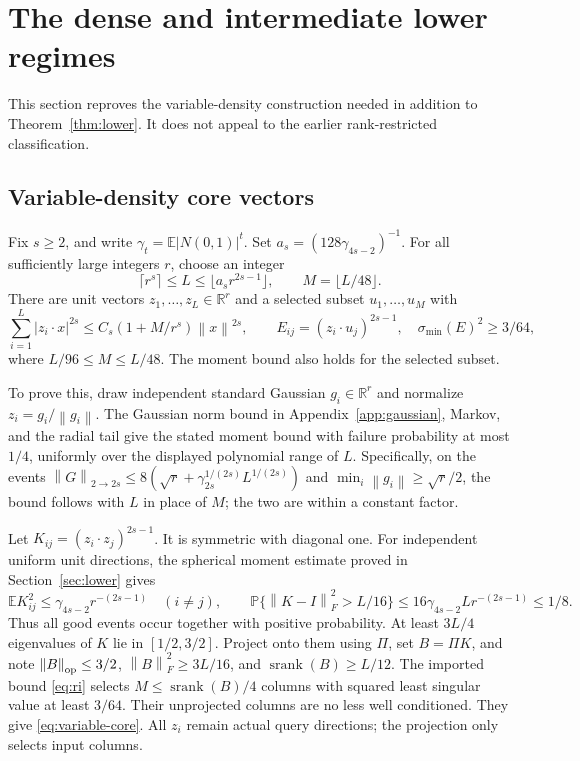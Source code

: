 \documentclass[11pt]{article}
\theoremstyle{remark}\newtheorem{remark}[theorem]{Remark}
\newcommand{\R}{\mathbb R}\newcommand{\E}{\mathbb E}\newcommand{\Prob}{\mathbb P}
\newcommand{\norm}[1]{\left\|#1\right\|}\newcommand{\ip}[2]{\left\langle #1,#2\right\rangle}
\DeclareMathOperator{\srank}{srank}
\begin{document}
\section{The dense and intermediate lower regimes}\label{sec:variable-lower}
This section reproves the variable-density construction needed in addition to Theorem~\ref{thm:lower}. It does not appeal to the earlier rank-restricted classification.

\subsection{Variable-density core vectors}
Fix $s\ge2$, and write $\gamma_t=\E|N(0,1)|^t$. Set $a_s=(128\gamma_{4s-2})^{-1}$. For all sufficiently large integers $r$, choose an integer
\[
 \lceil r^s\rceil\le L\le\lfloor a_s r^{2s-1}\rfloor,
 \qquad M=\lfloor L/48\rfloor.
\]
There are unit vectors $z_1,\ldots,z_L\in\R^r$ and a selected subset $u_1,\ldots,u_M$ with
\begin{equation}\label{eq:variable-core}
 \sum_{i=1}^L|z_i\cdot x|^{2s}\le C_s(1+M/r^s)\norm x^{2s},\qquad
 E_{ij}=(z_i\cdot u_j)^{2s-1},\quad \sigma_{\min}(E)^2\ge3/64,
\end{equation}
where $L/96\le M\le L/48$. The moment bound also holds for the selected subset.

To prove this, draw independent standard Gaussian $g_i\in\R^r$ and normalize $z_i=g_i/\norm{g_i}$. The Gaussian norm bound in Appendix~\ref{app:gaussian}, Markov, and the radial tail give the stated moment bound with failure probability at most $1/4$, uniformly over the displayed polynomial range of $L$. Specifically, on the events $\norm G_{2\to2s}\le8(\sqrt r+\gamma_{2s}^{1/(2s)}L^{1/(2s)})$ and $\min_i\norm{g_i}\ge\sqrt r/2$, the bound follows with $L$ in place of $M$; the two are within a constant factor.

Let $K_{ij}=(z_i\cdot z_j)^{2s-1}$. It is symmetric with diagonal one. For independent uniform unit directions, the spherical moment estimate proved in Section~\ref{sec:lower} gives
\[
 \E K_{ij}^2\le\gamma_{4s-2}r^{-(2s-1)}\quad(i\ne j),\qquad
 \Prob\{\norm{K-I}_F^2>L/16\}\le16\gamma_{4s-2}Lr^{-(2s-1)}\le1/8.
\]
Thus all good events occur together with positive probability. At least $3L/4$ eigenvalues of $K$ lie in $[1/2,3/2]$. Project onto them using $\Pi$, set $B=\Pi K$, and note
$\norm B_{\op}\le3/2$, $\norm B_F^2\ge3L/16$, and $\srank(B)\ge L/12$.
The imported bound \eqref{eq:ri} selects $M\le\srank(B)/4$ columns with squared least singular value at least $3/64$. Their unprojected columns are no less well conditioned. They give \eqref{eq:variable-core}. All $z_i$ remain actual query directions; the projection only selects input columns.
\end{document}
